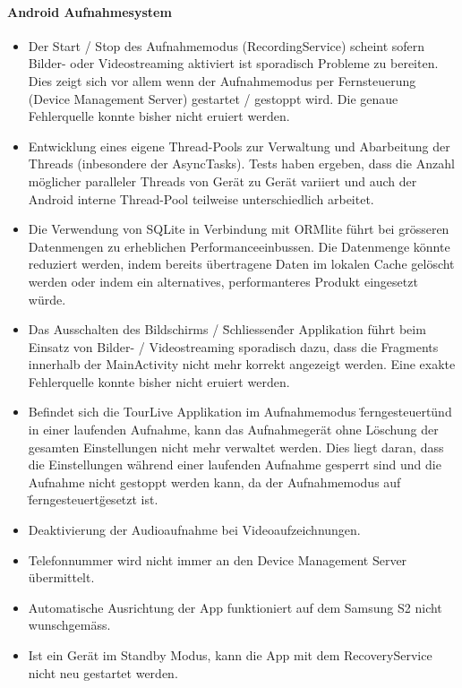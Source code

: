 \paragraph{Android Aufnahmesystem}
\begin{itemize}
	\item Der Start / Stop des Aufnahmemodus (RecordingService) scheint sofern Bilder- oder Videostreaming aktiviert ist sporadisch Probleme zu bereiten. Dies zeigt sich vor allem wenn der Aufnahmemodus per Fernsteuerung (Device Management Server) gestartet / gestoppt wird. Die genaue Fehlerquelle konnte bisher nicht eruiert werden.
	\item Entwicklung eines eigene Thread-Pools zur Verwaltung und Abarbeitung der Threads (inbesondere der AsyncTasks). Tests haben ergeben, dass die Anzahl möglicher paralleler Threads von Gerät zu Gerät variiert und auch der Android interne Thread-Pool teilweise unterschiedlich arbeitet. 
	\item Die Verwendung von SQLite in Verbindung mit ORMlite führt bei grösseren Datenmengen zu erheblichen Performanceeinbussen. Die Datenmenge könnte reduziert werden, indem bereits übertragene Daten im lokalen Cache gelöscht werden oder indem ein alternatives, performanteres Produkt eingesetzt würde.
	\item Das Ausschalten des Bildschirms / \"Schliessen\" der Applikation führt beim Einsatz von Bilder- / Videostreaming sporadisch dazu, dass die Fragments innerhalb der MainActivity nicht mehr korrekt angezeigt werden. Eine exakte Fehlerquelle konnte bisher nicht eruiert werden. 
	\item Befindet sich die TourLive Applikation im Aufnahmemodus \"ferngesteuert\" und in einer laufenden Aufnahme, kann das Aufnahmegerät ohne Löschung der gesamten Einstellungen nicht mehr verwaltet werden. Dies liegt daran, dass die Einstellungen während einer laufenden Aufnahme gesperrt sind und die Aufnahme nicht gestoppt werden kann, da der Aufnahmemodus auf \"ferngesteuert\" gesetzt ist. 
	\item Deaktivierung der Audioaufnahme bei Videoaufzeichnungen.
	\item Telefonnummer wird nicht immer an den Device Management Server übermittelt.
	\item Automatische Ausrichtung der App funktioniert auf dem Samsung S2 nicht wunschgemäss.
	\item Ist ein Gerät im Standby Modus, kann die App mit dem RecoveryService nicht neu gestartet werden.
	
\end{itemize}


